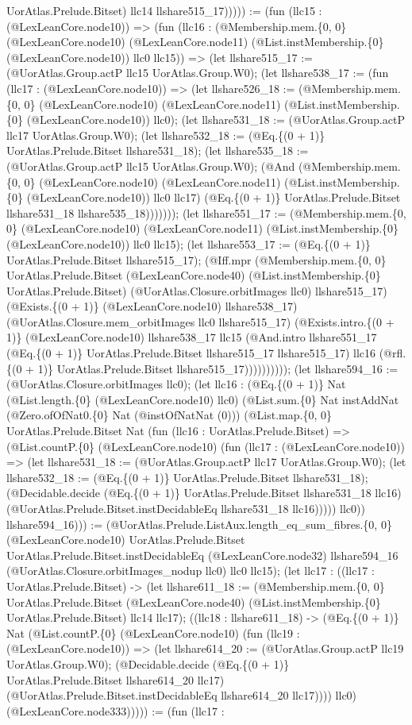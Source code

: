 \documentclass[11pt]{article}
\begin{document}
UorAtlas.Prelude.Bitset) llc14 llshare515\_17))))) := (fun (llc15 : (@LexLeanCore.node10)) => (fun (llc16 : (@Membership.mem.\{0, 0\} (@LexLeanCore.node10) (@LexLeanCore.node11) (@List.instMembership.\{0\} (@LexLeanCore.node10)) llc0 llc15)) => (let llshare515\_17 := (@UorAtlas.Group.actP llc15 UorAtlas.Group.W0); (let llshare538\_17 := (fun (llc17 : (@LexLeanCore.node10)) => (let llshare526\_18 := (@Membership.mem.\{0, 0\} (@LexLeanCore.node10) (@LexLeanCore.node11) (@List.instMembership.\{0\} (@LexLeanCore.node10)) llc0); (let llshare531\_18 := (@UorAtlas.Group.actP llc17 UorAtlas.Group.W0); (let llshare532\_18 := (@Eq.\{(0 + 1)\} UorAtlas.Prelude.Bitset llshare531\_18); (let llshare535\_18 := (@UorAtlas.Group.actP llc15 UorAtlas.Group.W0); (@And (@Membership.mem.\{0, 0\} (@LexLeanCore.node10) (@LexLeanCore.node11) (@List.instMembership.\{0\} (@LexLeanCore.node10)) llc0 llc17) (@Eq.\{(0 + 1)\} UorAtlas.Prelude.Bitset llshare531\_18 llshare535\_18))))))); (let llshare551\_17 := (@Membership.mem.\{0, 0\} (@LexLeanCore.node10) (@LexLeanCore.node11) (@List.instMembership.\{0\} (@LexLeanCore.node10)) llc0 llc15); (let llshare553\_17 := (@Eq.\{(0 + 1)\} UorAtlas.Prelude.Bitset llshare515\_17); (@Iff.mpr (@Membership.mem.\{0, 0\} UorAtlas.Prelude.Bitset (@LexLeanCore.node40) (@List.instMembership.\{0\} UorAtlas.Prelude.Bitset) (@UorAtlas.Closure.orbitImages llc0) llshare515\_17) (@Exists.\{(0 + 1)\} (@LexLeanCore.node10) llshare538\_17) (@UorAtlas.Closure.mem\_orbitImages llc0 llshare515\_17) (@Exists.intro.\{(0 + 1)\} (@LexLeanCore.node10) llshare538\_17 llc15 (@And.intro llshare551\_17 (@Eq.\{(0 + 1)\} UorAtlas.Prelude.Bitset llshare515\_17 llshare515\_17) llc16 (@rfl.\{(0 + 1)\} UorAtlas.Prelude.Bitset llshare515\_17)))))))))); (let llshare594\_16 := (@UorAtlas.Closure.orbitImages llc0); (let llc16 : (@Eq.\{(0 + 1)\} Nat (@List.length.\{0\} (@LexLeanCore.node10) llc0) (@List.sum.\{0\} Nat instAddNat (@Zero.ofOfNat0.\{0\} Nat (@instOfNatNat (0))) (@List.map.\{0, 0\} UorAtlas.Prelude.Bitset Nat (fun (llc16 : UorAtlas.Prelude.Bitset) => (@List.countP.\{0\} (@LexLeanCore.node10) (fun (llc17 : (@LexLeanCore.node10)) => (let llshare531\_18 := (@UorAtlas.Group.actP llc17 UorAtlas.Group.W0); (let llshare532\_18 := (@Eq.\{(0 + 1)\} UorAtlas.Prelude.Bitset llshare531\_18); (@Decidable.decide (@Eq.\{(0 + 1)\} UorAtlas.Prelude.Bitset llshare531\_18 llc16) (@UorAtlas.Prelude.Bitset.instDecidableEq llshare531\_18 llc16))))) llc0)) llshare594\_16))) := (@UorAtlas.Prelude.ListAux.length\_eq\_sum\_fibres.\{0, 0\} (@LexLeanCore.node10) UorAtlas.Prelude.Bitset UorAtlas.Prelude.Bitset.instDecidableEq (@LexLeanCore.node32) llshare594\_16 (@UorAtlas.Closure.orbitImages\_nodup llc0) llc0 llc15); (let llc17 : ((llc17 : UorAtlas.Prelude.Bitset) -> (let llshare611\_18 := (@Membership.mem.\{0, 0\} UorAtlas.Prelude.Bitset (@LexLeanCore.node40) (@List.instMembership.\{0\} UorAtlas.Prelude.Bitset) llc14 llc17); ((llc18 : llshare611\_18) -> (@Eq.\{(0 + 1)\} Nat (@List.countP.\{0\} (@LexLeanCore.node10) (fun (llc19 : (@LexLeanCore.node10)) => (let llshare614\_20 := (@UorAtlas.Group.actP llc19 UorAtlas.Group.W0); (@Decidable.decide (@Eq.\{(0 + 1)\} UorAtlas.Prelude.Bitset llshare614\_20 llc17) (@UorAtlas.Prelude.Bitset.instDecidableEq llshare614\_20 llc17)))) llc0) (@LexLeanCore.node333))))) := (fun (llc17 : 
\end{document}
